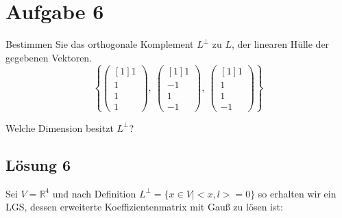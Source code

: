 \documentclass[main.tex]{subfiles}
\begin{document}
\arraycolsep=1pt %


\section{Aufgabe 6}
Bestimmen Sie das orthogonale Komplement $L^{\perp }$ zu $L$, der linearen Hülle der gegebenen Vektoren.
\begin{equation*}
    \left\{\begin{pmatrix}[1]
    1\\
    1\\
    1\\
    1
    \end{pmatrix} ,\ \begin{pmatrix}[1]
    1\\
    -1\\
    1\\
    -1
    \end{pmatrix} ,\ \begin{pmatrix}[1]
    1\\
    1\\
    1\\
    -1
    \end{pmatrix}\right\}
\end{equation*}

Welche Dimension besitzt $L^{\perp }$?

\subsection{Lösung 6}
Sei $V=\mathbb{R}^{4}$ und nach Definition $L^{\perp } =\{x\in V|< x,l> =0\}$ so erhalten wir ein LGS, dessen erweiterte Koeffizientenmatrix mit Gauß zu lösen ist:
\end{document}
